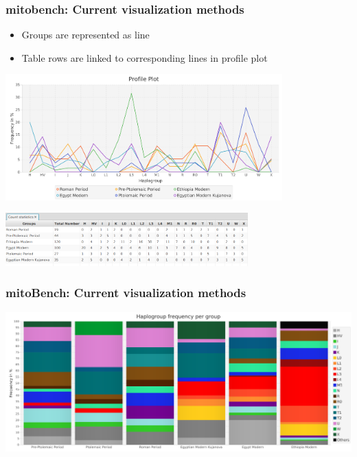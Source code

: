 \documentclass{beamer} %
\begin{document}
\begin{frame}
	\frametitle{mitobench: Current visualization methods}
	\begin{itemize}
		\item Groups are represented as line
		\item Table rows are linked to corresponding lines in profile plot
	\end{itemize}
	
	\begin{center}
		\includegraphics[width=0.8\textwidth]{imagesBench/profile.png}
	\end{center}
	\begin{center}
		\includegraphics[width=0.7\textwidth]{imagesBench/profile_table.png}
	\end{center}
\end{frame}


\begin{frame}
\frametitle{mitoBench: Current visualization methods}
\begin{center}
	\includegraphics[width=\textwidth]{imagesBench/stackedBarchart.png}
	\end{center}
\end{frame}
\end{document}
